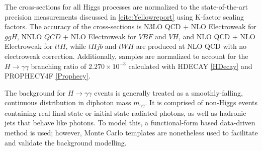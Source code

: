 The cross-sections for all Higgs processes are normalized to the state-of-the-art precision measurements discussed in \ref{cite:Yellowreport} using K-factor scaling factors. The accuracy of the cross-sections is N3LO QCD $+$ NLO Electroweak for $ggH$, NNLO $QCD$ $+$ NLO Electroweak for $VBF$ and $VH$, and NLO QCD $+$ NLO Electroweak for $ttH$, while $tHjb$ and $tWH$ are produced at NLO QCD with no electroweak correction. Additionally, samples are normalized to account for the $H \rightarrow \gamma \gamma$ branching ratio of $2.270 \times 10^{-3}$ calculated with HDECAY \ref{HDecay} and PROPHECY4F \ref{Prophecy}.

\begin{table}[h!]
  \centering
  \caption{Cross sections times branching ratio values used to normalize each production mode. The values correspond to the state-of-the-art predictions and are taken from the CERN Yellow Report \ref{cite:yellowreport}.}
  \label{tab:signal_samples_norm}
\end{table}  

The background for $H \rightarrow \gamma \gamma$ events is generally treated as a smoothly-falling, continuous distribution in diphoton mass $m_{\gamma \gamma}$. It is comprised of non-Higgs events containing real final-state or initial-state radiated photons, as well as hadronic jets that behave like photons. To model this, a functional-form based data-driven method is used; however, Monte Carlo templates are nonetheless used to facilitate and validate the background modelling.


